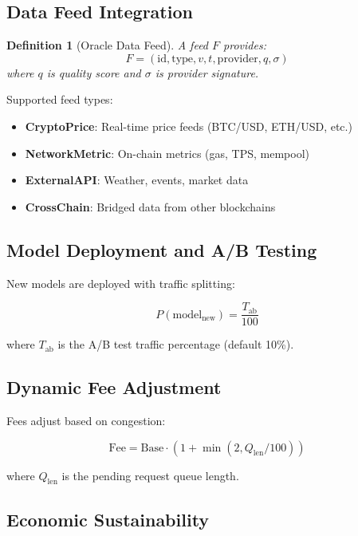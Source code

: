 \documentclass[11pt,a4paper]{article}
\newtheorem{definition}[theorem]{Definition}
\begin{document}
\subsection{Data Feed Integration}

\begin{definition}[Oracle Data Feed]
A feed $F$ provides:
\begin{equation}
F = (\text{id}, \text{type}, v, t, \text{provider}, q, \sigma)
\end{equation}
where $q$ is quality score and $\sigma$ is provider signature.
\end{definition}

Supported feed types:
\begin{itemize}
    \item \textbf{CryptoPrice}: Real-time price feeds (BTC/USD, ETH/USD, etc.)
    \item \textbf{NetworkMetric}: On-chain metrics (gas, TPS, mempool)
    \item \textbf{ExternalAPI}: Weather, events, market data
    \item \textbf{CrossChain}: Bridged data from other blockchains
\end{itemize}

\subsection{Model Deployment and A/B Testing}

New models are deployed with traffic splitting:

\begin{equation}
P(\text{model}_{\text{new}}) = \frac{T_{\text{ab}}}{100}
\end{equation}

where $T_{\text{ab}}$ is the A/B test traffic percentage (default 10\%).

\subsection{Dynamic Fee Adjustment}

Fees adjust based on congestion:

\begin{equation}
\text{Fee} = \text{Base} \cdot (1 + \min(2, Q_{\text{len}}/100))
\end{equation}

where $Q_{\text{len}}$ is the pending request queue length.

\subsection{Economic Sustainability}
\end{document}
